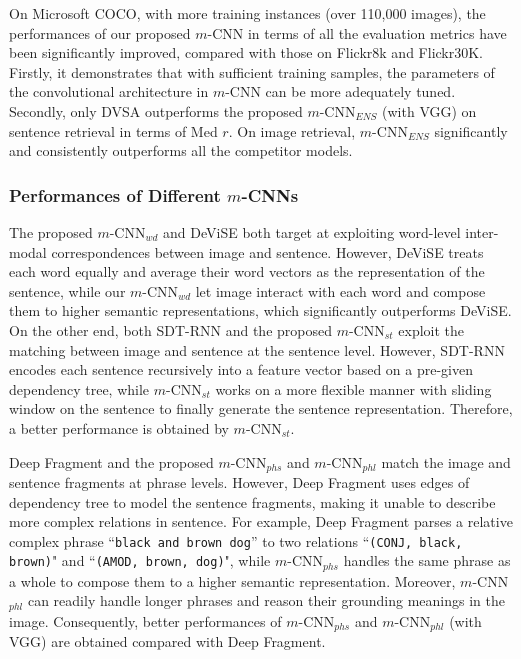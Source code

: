 \documentclass[10pt,twocolumn,letterpaper]{article}
\begin{document}
On Microsoft COCO, with more training instances (over 110,000 images), the performances of our proposed $m$-CNN in terms of all the evaluation metrics have been significantly improved, compared with those on Flickr8k and Flickr30K. Firstly, it demonstrates that with sufficient training samples, the parameters of the convolutional architecture in $m$-CNN can be more adequately tuned. Secondly, only DVSA outperforms the proposed $m$-CNN$_{ENS}$ (with VGG) on sentence retrieval in terms of Med $r$. On image retrieval, $m$-CNN$_{ENS}$ significantly and consistently outperforms all the competitor models.












\vspace{-5pt}
\subsubsection {Performances of Different $m$-CNNs}


The proposed $m$-CNN$_{wd}$ and DeViSE \cite{frome_nips2013} both target at exploiting word-level inter-modal correspondences between image and sentence. However, DeViSE treats each word equally and average their word vectors as the representation of the sentence, while our $m$-CNN$_{wd}$ let image interact with each word and compose them to higher semantic representations, which significantly outperforms DeViSE. On the other end, both SDT-RNN \cite{socher_tacl2014} and the proposed $m$-CNN$_{st}$ exploit the matching between image and sentence at the sentence level. However, SDT-RNN encodes each sentence recursively into a feature vector based on a pre-given dependency tree, while $m$-CNN$_{st}$ works on a more flexible manner with sliding window on the sentence to finally generate the sentence representation. Therefore, a better performance is obtained by  $m$-CNN$_{st}$.

Deep Fragment \cite{karpathy_2014} and the proposed $m$-CNN$_{phs}$ and $m$-CNN$_{phl}$ match the image and sentence fragments at phrase levels. However, Deep Fragment uses edges of dependency tree to model the sentence fragments, making it unable to describe more complex relations in sentence. For example, Deep Fragment parses a relative complex phrase ``\texttt{\small black and brown dog}'' to two relations  ``\texttt{\small (CONJ, black, brown)}" and ``\texttt{\small (AMOD, brown, dog)}", while $m$-CNN$_{phs}$ handles the same phrase as a whole to compose them to a higher semantic representation. Moreover, $m$-CNN$_{phl}$ can readily handle longer phrases and reason their grounding meanings in the image. Consequently, better performances of $m$-CNN$_{phs}$ and $m$-CNN$_{phl}$ (with VGG) are obtained compared with Deep Fragment.
\end{document}

